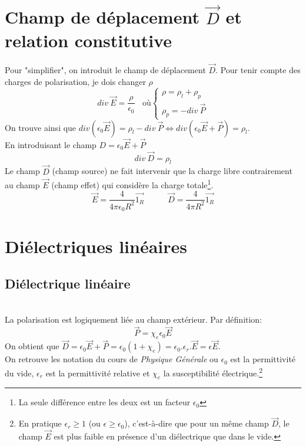 \documentclass[british,french,11pt, a4paper, openany]{book}
\begin{document}
		\section{Champ de déplacement $\vec{D}$ et relation constitutive}
		Pour "simplifier", on introduit le champ de déplacement $\vec{D}$. Pour tenir compte des charges de polarisation, je dois changer $\rho$ 
		\begin{equation}
		div\ \vec{E} = \frac{\rho}{\epsilon_0}\ \ \ \ \text{où} \left\{\begin{array}{l}
		\rho = \rho_l + \rho_p\\
		\rho_p = -div\ \vec{P}
		\end{array}\right.
		\end{equation}
		On trouve ainsi que $div(\epsilon_0\vec{E}) = \rho_l - div\ \vec{P} \Leftrightarrow div(\epsilon_0\vec{E} + \vec{P}) = \rho_l$.\\
		En introduisant le champ $D = \epsilon_0\vec{E} + \vec{P}$
		\begin{equation}
		div\ \vec{D} = \rho_l
		\end{equation}
		Le champ $\vec{D}$ (champ source) ne fait intervenir que la charge libre contrairement au champ $\vec{E}$ (champ effet) qui considère la charge totale\footnote{La seule différence entre les deux est un facteur $\epsilon_0$}.
		\begin{equation}
		\vec{E} = \frac{4}{4\pi\epsilon_0R^2}\vec{1_R}\ \ \ \ \ \ \ \ \ \ \ \ \ \vec{D} = \frac{4}{4\pi R^2}\vec{1_R}
		\end{equation}
		
		\section{Diélectriques linéaires}
		\setcounter{subsection}{1}
		\subsection{Diélectrique linéaire}
		\ \\
		La polarisation est logiquement liée au champ extérieur. Par définition:
		\begin{equation}
		\vec{P} = \chi_e \epsilon_0\vec{E}
		\end{equation}
		On obtient que $\vec{D} = \epsilon_0\vec{E} + \vec{P} = \epsilon_0(1+\chi_e) = \epsilon_0.\epsilon_r.\vec{E} = \epsilon\vec{E}$.\\
		On retrouve les notation du cours de \textit{Physique Générale} ou $\epsilon_0$ est la permittivité du vide, $\epsilon_r$ est la permittivité relative et $\chi_e$ la susceptibilité électrique.\footnote{En pratique $\epsilon_r \geq 1$ (ou $\epsilon \geq \epsilon_0$), c'est-à-dire que pour un même champ $\vec{D}$, le champ $\vec{E}$ est plus faible en présence d'un diélectrique que dans le vide.}
		
\end{document}
